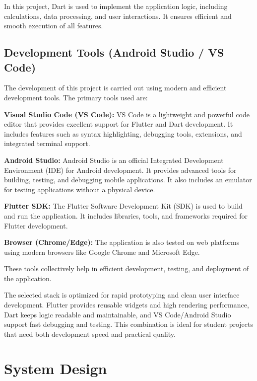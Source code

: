 \documentclass{article}
\begin{document}
In this project, Dart is used to implement the application logic, including calculations, data processing, and user interactions. It ensures efficient and smooth execution of all features.

\subsection{Development Tools (Android Studio / VS Code)}

The development of this project is carried out using modern and efficient development tools. The primary tools used are:

\textbf{Visual Studio Code (VS Code):}  
VS Code is a lightweight and powerful code editor that provides excellent support for Flutter and Dart development. It includes features such as syntax highlighting, debugging tools, extensions, and integrated terminal support.

\textbf{Android Studio:}  
Android Studio is an official Integrated Development Environment (IDE) for Android development. It provides advanced tools for building, testing, and debugging mobile applications. It also includes an emulator for testing applications without a physical device.

\textbf{Flutter SDK:}  
The Flutter Software Development Kit (SDK) is used to build and run the application. It includes libraries, tools, and frameworks required for Flutter development.

\textbf{Browser (Chrome/Edge):}  
The application is also tested on web platforms using modern browsers like Google Chrome and Microsoft Edge.

These tools collectively help in efficient development, testing, and deployment of the application.

\begin{insightbox}
The selected stack is optimized for rapid prototyping and clean user interface development. Flutter provides reusable widgets and high rendering performance, Dart keeps logic readable and maintainable, and VS Code/Android Studio support fast debugging and testing. This combination is ideal for student projects that need both development speed and practical quality.
\end{insightbox}


\section{System Design}
\end{document}
